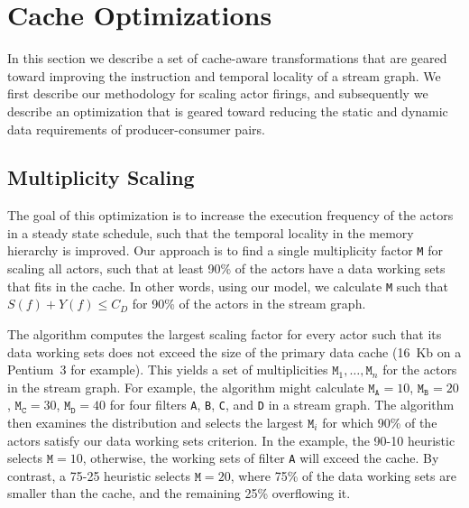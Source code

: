 \section{Cache Optimizations}
\label{sec:cache-opt}

In this section we describe a set of cache-aware transformations that
are geared toward improving the instruction and temporal locality of a
stream graph. We first describe our methodology for scaling actor
firings, and subsequently we describe an optimization that is geared
toward reducing the static and dynamic data requirements of
producer-consumer pairs.



\subsection{Multiplicity Scaling}

The goal of this optimization is to increase the execution frequency
of the actors in a steady state schedule, such that the temporal
locality in the memory hierarchy is improved. Our approach is to find a
single multiplicity factor \texttt{M} for scaling all actors, such that
at least 90\% of the actors have a data working sets that fits in the cache.
In other words, using our model, we calculate \texttt{M} such that 
$S(f) + Y(f) \leq C_D$
for 90\% of the actors in the stream graph.

The algorithm 
computes the largest scaling factor for every actor such that its data
working sets does not exceed the size of the primary data cache
(16~Kb on a Pentium~3 for example). This yields a set of multiplicities
${\texttt{M}_1, \ldots, \texttt{M}_n}$ for the actors in the stream
graph. For example, the algorithm might calculate
$\texttt{M}_\texttt{A} = 10$,
$\texttt{M}_\texttt{B} = 20$, 
$\texttt{M}_\texttt{C} = 30$, 
$\texttt{M}_\texttt{D} = 40$ for four filters \texttt{A}, \texttt{B},
\texttt{C}, and \texttt{D} in a stream graph.
The algorithm then examines the
distribution and selects the largest $\texttt{M}_i$
for which 90\% of the actors satisfy our data working sets criterion.
In the example, the 90-10 heuristic
selects $\texttt{M} = 10$, otherwise, the working sets of filter
\texttt{A} will exceed the cache. By contrast,
a 75-25 heuristic selects $\texttt{M} = 20$, where 75\% of the
data working sets are smaller than the cache, and the remaining 25\%
overflowing it.

